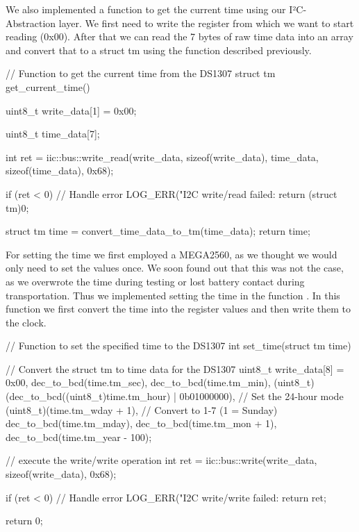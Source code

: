 We also implemented a function to get the current time using our I²C-Abstraction layer. We first need to write the register from which we want to start reading (0x00). After that we can read the 7 bytes of raw time data into an array and convert that to a struct tm using the function described previously.

\begin{cpp}
// Function to get the current time from the DS1307
struct tm get_current_time()
{
    uint8_t write_data[1] = {0x00};

    uint8_t time_data[7];

    int ret = iic::bus::write_read(write_data, sizeof(write_data), time_data, sizeof(time_data), 0x68);

    if (ret < 0)
    {
        // Handle error
        LOG_ERR("I2C write/read failed: %
        return (struct tm){0};
    }

    struct tm time = convert_time_data_to_tm(time_data);
    return time;
}
\end{cpp}

For setting the time we first employed a MEGA2560, as we thought we would only need to set the values once. We soon found out that this was not the case, as we overwrote the time during testing or lost battery contact during transportation.
Thus we implemented setting the time in the function . In this function we first convert the time into the register values and then write them to the clock.

\begin{cpp}
// Function to set the specified time to the DS1307
int set_time(struct tm time)
{
    // Convert the struct tm to time data for the DS1307
    uint8_t write_data[8] = {
        0x00,
        dec_to_bcd(time.tm_sec),
        dec_to_bcd(time.tm_min),
        (uint8_t)(dec_to_bcd((uint8_t)time.tm_hour) | 0b01000000), // Set the 24-hour mode
        (uint8_t)(time.tm_wday + 1),                               // Convert to 1-7 (1 = Sunday)
        dec_to_bcd(time.tm_mday),
        dec_to_bcd(time.tm_mon + 1),
        dec_to_bcd(time.tm_year - 100)};

    // execute the write/write operation
    int ret = iic::bus::write(write_data, sizeof(write_data), 0x68);

    if (ret < 0)
    {
        // Handle error
        LOG_ERR("I2C write/write failed: %
        return ret;
    }

    return 0;
}
\end{cpp}

